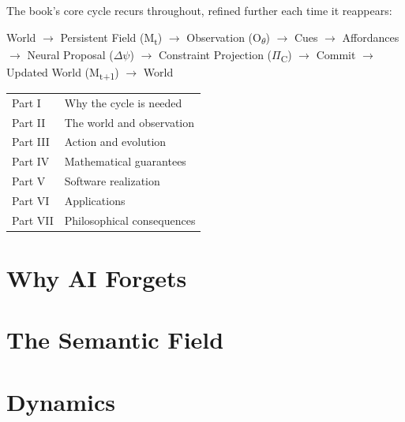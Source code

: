 \documentclass[11pt,oneside]{book}
\begin{document}
The book's core cycle recurs throughout, refined further each time it
reappears:
\begin{center}
World \(\to\) Persistent Field (M\textsubscript{t}) \(\to\)
Observation (O\textsubscript{\(\theta\)}) \(\to\) Cues \(\to\)
Affordances \(\to\) Neural Proposal (\(\Delta\)\(\psi\)) \(\to\)
Constraint Projection (\(\Pi\)\textsubscript{C}) \(\to\) Commit \(\to\)
Updated World (M\textsubscript{t+1}) \(\to\) World
\end{center}

\begin{center}
\begin{tabular}{ll}
Part I & Why the cycle is needed \\
Part II & The world and observation \\
Part III & Action and evolution \\
Part IV & Mathematical guarantees \\
Part V & Software realization \\
Part VI & Applications \\
Part VII & Philosophical consequences \\
\end{tabular}
\end{center}

\tableofcontents

\mainmatter

\part{Why AI Forgets}






\part{The Semantic Field}







\part{Dynamics}






\end{document}
